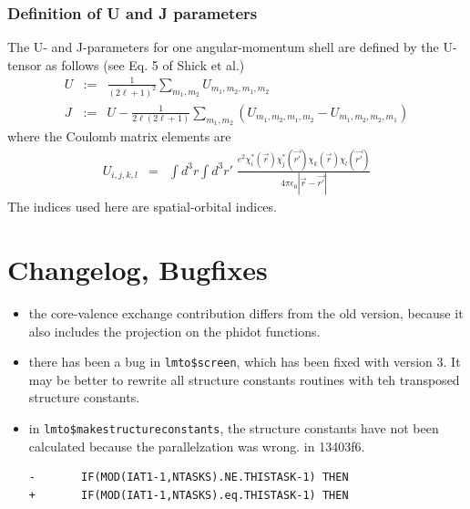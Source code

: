 \documentclass[11pt,a4paper]{report}
\begin{document}
\subsection{Definition of U and J parameters}
The U- and J-parameters for one angular-momentum shell are defined by
the U-tensor as follows\cite{shick99_prb60_10763} (see Eq. 5 of Shick
et al.)
\begin{eqnarray}
U&:=&\frac{1}{(2\ell+1)^2}\sum_{m_1,m_2} U_{m_1,m_2,m_1,m_2}
\label{eq:ldaplusudefu}
\\
J&:=&U-\frac{1}{2\ell(2\ell+1)}\sum_{m_1,m_2}\left( U_{m_1,m_2,m_1,m_2}
-U_{m_1,m_2,m_2,m_1}\right)
\label{eq:ldaplusudefj}
\end{eqnarray}
where the Coulomb matrix elements are
\begin{eqnarray}
U_{i,j,k,l}&=&\int d^3r\int d^3r'\;
\frac{e^2\chi^*_i(\vec{r})\chi^*_j(\vec{r'})\chi_k(\vec{r})\chi_l(\vec{r'})}
{4\pi\epsilon_0|\vec{r}-\vec{r'}|}
\label{eq:defcoulombmatrixelement}
\end{eqnarray}
The indices used here are spatial-orbital indices.



\chapter{Changelog, Bugfixes}
\begin{itemize}
%
\item the core-valence exchange contribution differs from the old
  version, because it also includes the projection on the phidot
  functions.
%
\item there has been a bug in \verb|lmto$screen|, which has been fixed
  with version 3. It may be better to rewrite all structure constants
  routines with teh transposed structure constants.
%
\item in \verb|lmto$makestructureconstants|, the structure constants
  have not been calculated because the parallelzation was wrong.  in
  13403f6.
\begin{verbatim}
-       IF(MOD(IAT1-1,NTASKS).NE.THISTASK-1) THEN
+       IF(MOD(IAT1-1,NTASKS).eq.THISTASK-1) THEN
\end{verbatim}
%
\end{itemize}


\clearpage
 
\end{document}
